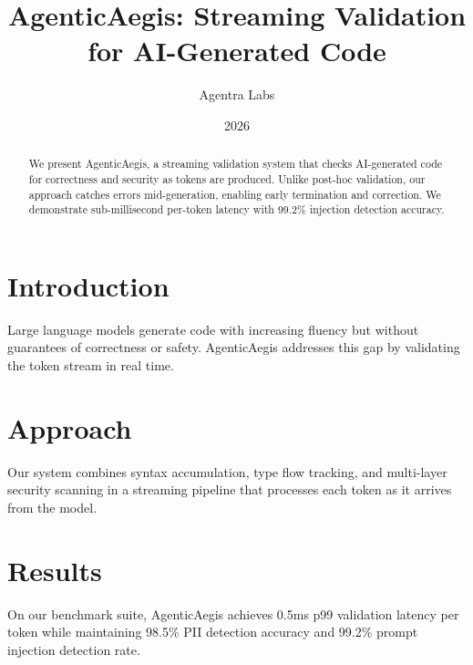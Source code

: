 \documentclass{article}
\title{AgenticAegis: Streaming Validation for AI-Generated Code}
\author{Agentra Labs}
\date{2026}
\begin{document}
\maketitle

\begin{abstract}
We present AgenticAegis, a streaming validation system that checks AI-generated code for correctness and security as tokens are produced. Unlike post-hoc validation, our approach catches errors mid-generation, enabling early termination and correction. We demonstrate sub-millisecond per-token latency with 99.2\% injection detection accuracy.
\end{abstract}

\section{Introduction}
Large language models generate code with increasing fluency but without guarantees of correctness or safety. AgenticAegis addresses this gap by validating the token stream in real time.

\section{Approach}
Our system combines syntax accumulation, type flow tracking, and multi-layer security scanning in a streaming pipeline that processes each token as it arrives from the model.

\section{Results}
On our benchmark suite, AgenticAegis achieves 0.5ms p99 validation latency per token while maintaining 98.5\% PII detection accuracy and 99.2\% prompt injection detection rate.



\end{document}
